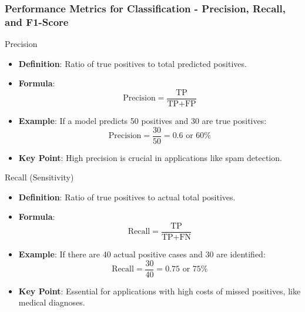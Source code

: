\documentclass[aspectratio=169]{beamer}
\begin{document}
\begin{frame}[fragile]
    \frametitle{Performance Metrics for Classification - Precision, Recall, and F1-Score}
    \begin{block}{Precision}
        \begin{itemize}
            \item \textbf{Definition}: Ratio of true positives to total predicted positives.
            \item \textbf{Formula}:
            \begin{equation}
            \text{Precision} = \frac{\text{TP}}{\text{TP} + \text{FP}}
            \end{equation}
            \item \textbf{Example}: If a model predicts 50 positives and 30 are true positives:
            \begin{equation}
            \text{Precision} = \frac{30}{50} = 0.6 \text{ or } 60\%
            \end{equation}
            \item \textbf{Key Point}: High precision is crucial in applications like spam detection.
        \end{itemize}
    \end{block}

    \begin{block}{Recall (Sensitivity)}
        \begin{itemize}
            \item \textbf{Definition}: Ratio of true positives to actual total positives.
            \item \textbf{Formula}:
            \begin{equation}
            \text{Recall} = \frac{\text{TP}}{\text{TP} + \text{FN}}
            \end{equation}
            \item \textbf{Example}: If there are 40 actual positive cases and 30 are identified:
            \begin{equation}
            \text{Recall} = \frac{30}{40} = 0.75 \text{ or } 75\%
            \end{equation}
            \item \textbf{Key Point}: Essential for applications with high costs of missed positives, like medical diagnoses.
        \end{itemize}
    \end{block}


\end{frame}
\end{document}
